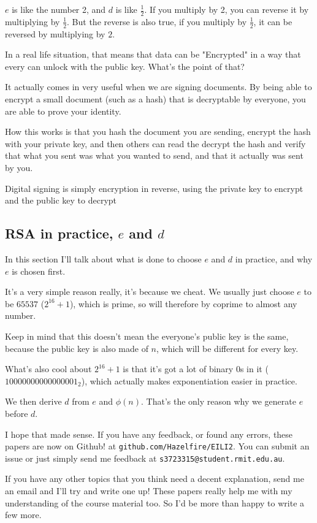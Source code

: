 \documentclass{article}
\begin{document}
  $e$ is like the number 2, and $d$ is like $\frac{1}{2}$. If you multiply by 2, you
  can reverse it by multiplying by $\frac{1}{2}$. But the reverse is also true,
  if you multiply by $\frac{1}{2}$, it can be reversed by multiplying by $2$.

  In a real life situation, that means that data can be "Encrypted" in a way that
  every can unlock with the public key. What's the point of that?

  It actually comes in very useful when we are signing documents. By being able
  to encrypt a small document (such as a hash) that is decryptable by everyone,
  you are able to prove your identity.

  How this works is that you hash the document you are sending, encrypt the hash
  with your private key, and then others can read the decrypt the hash and 
  verify that what you sent was what you wanted to send, and that it actually
  was sent by you.

  Digital signing is simply encryption in reverse, using the private key to
  encrypt and the public key to decrypt

  \subsection*{RSA in practice, $e$ and $d$}
  In this section I'll talk about what is done to choose $e$ and $d$ in practice,
  and why $e$ is chosen first.

  It's a very simple reason really, it's because we cheat. We usually just
  choose $e$ to be $65537$ ($2^{16} + 1$), which is prime, so will therefore by coprime to
  almost any number.

  Keep in mind that this doesn't mean the everyone's public key is the same,
  because the public key is also made of $n$, which will be different for
  every key.
  
  What's also cool about $2^{16} + 1$ is that it's got a lot of binary $0$s in it
  ($10000000000000001_2$), which actually makes exponentiation easier in practice.

  We then derive $d$ from $e$ and $\phi(n)$. That's the only reason why we generate
  $e$ before $d$.

  I hope that made sense. If you have any feedback, or found any errors, these
  papers are now on Github! at \texttt{github.com/Hazelfire/EILI2}. You can
  submit an issue or just simply send me feedback at \texttt{s3723315@student.rmit.edu.au}.

  If you have any other topics that you think need a decent explanation, send
  me an email and I'll try and write one up! These papers really help me with
  my understanding of the course material too. So I'd be more than happy to
  write a few more.
\end{document}
